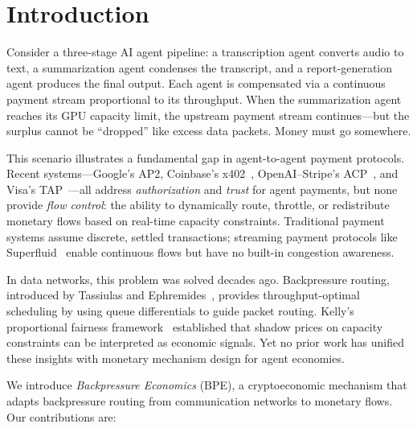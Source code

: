 \section{Introduction}
\label{sec:intro}

Consider a three-stage AI agent pipeline: a transcription agent converts audio to text,
a summarization agent condenses the transcript, and a report-generation agent produces
the final output. Each agent is compensated via a continuous payment stream proportional
to its throughput. When the summarization agent reaches its GPU capacity limit, the upstream
payment stream continues---but the surplus cannot be ``dropped'' like excess data packets.
Money must go somewhere.

This scenario illustrates a fundamental gap in agent-to-agent
payment protocols. Recent systems---Google's AP2, Coinbase's x402~\cite{coinbase2025x402},
OpenAI--Stripe's ACP~\cite{openai2025acp}, and Visa's TAP~\cite{visa2025tap}---all address
\emph{authorization} and \emph{trust} for agent payments, but none provide \emph{flow control}:
the ability to dynamically route, throttle, or redistribute monetary flows based on real-time
capacity constraints. Traditional payment systems assume discrete, settled transactions; streaming
payment protocols like Superfluid~\cite{superfluid2024} enable continuous flows but have no
built-in congestion awareness.

In data networks, this problem was solved decades ago. Backpressure routing, introduced by
Tassiulas and Ephremides~\cite{tassiulas1992stability}, provides throughput-optimal scheduling
by using queue differentials to guide packet routing. Kelly's proportional fairness
framework~\cite{kelly1998rate} established that shadow prices on capacity constraints can be
interpreted as economic signals. Yet no prior work has unified these insights with monetary
mechanism design for agent economies.

We introduce \emph{Backpressure Economics} (BPE), a cryptoeconomic mechanism that adapts
backpressure routing from communication networks to monetary flows. Our contributions are:

